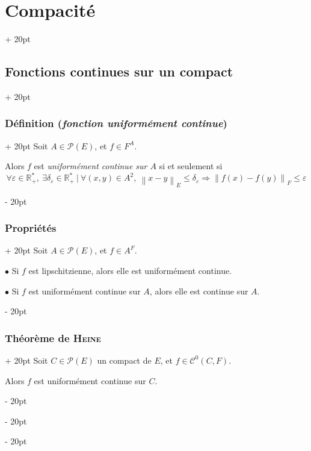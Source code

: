 \documentclass[a4paper, 12pt, twoside]{article}
\newcommand{\R}{\mathbb{R}} %
\newcommand{\norm}[1]{\left\lVert #1 \right\rVert}
\renewcommand{\le}{\leqslant}
\newcommand{\ind}[1][20pt]{\advance\leftskip + #1}
\newcommand{\deind}[1][20pt]{\advance\leftskip - #1}
\newenvironment{indt}[2][20pt]{#2 \par \ind[#1]}{\par \deind} %
\begin{document}
\begin{indt}{\section{Compacité}}
\begin{indt}{\subsection{Fonctions continues sur un compact}}
            \vspace{12pt}
            
            \begin{indt}{\subsubsection{Définition (\textit{fonction uniformément continue})}}
                Soit $A \in \mathcal P(E)$, et $f \in F^A$.

                Alors $f$ est \emph{uniformément continue sur $A$} si et seulement si
                \[
                    \forall \varepsilon \in \R^*_+,\
                    \exists \delta_\varepsilon \in \R^*_+\ |\
                    \forall (x, y) \in A^2,\
                    \norm{x - y}_E \le \delta_\varepsilon \Rightarrow \norm{f(x) - f(y)}_F \le \varepsilon
                \]
            \end{indt}

            \vspace{12pt}
            
            \begin{indt}{\subsubsection{Propriétés}}
                Soit $A \in \mathcal P(E)$, et $f \in A^F$.

                \vspace{6pt}
                
                $\bullet$ Si $f$ est lipschitzienne, alors elle est uniformément continue.

                \vspace{6pt}
                
                $\bullet$ Si $f$ est uniformément continue sur $A$, alors elle est continue sur $A$.
            \end{indt}

            \vspace{12pt}
            
            \begin{indt}{\subsubsection{Théorème de \textsc{Heine}}}
                Soit $C \in \mathcal P(E)$ un compact de $E$, et $f \in \mathcal C^0(C, F)$.

                \vspace{6pt}
                
                Alors $f$ est uniformément continue sur $C$.
            \end{indt}
        \end{indt}
    \end{indt}
\end{document}
